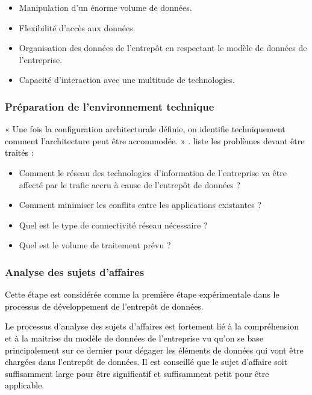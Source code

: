 \documentclass[a4paper,12pt]{report}
\begin{document}
\begin{itemize}

\item  Manipulation d’un énorme volume de données.
\item  Flexibilité d’accès aux données.
\item  Organisation des données de l’entrepôt en respectant le modèle de données de l’entreprise.
\item Capacité d’interaction avec une multitude de technologies.

\end{itemize}

\subsubsection{Préparation de l’environnement technique}

\textcolor{black}{« Une fois la configuration architecturale définie, on identifie techniquement comment l’architecture peut être accommodée. » \citep{inmon2002building}. \citep{inmon2002building} liste les problèmes devant être traités :}

\begin{itemize}
\item Comment le réseau des technologies d’information de l’entreprise va être affecté par le trafic accru à cause de l’entrepôt de données ?
\item Comment minimiser les conflits entre les applications existantes ?
\item Quel est le type de connectivité réseau nécessaire ?
\item Quel est le volume de traitement prévu ?

\end{itemize}

\subsubsection{Analyse des sujets d’affaires}

\textcolor{black}{Cette étape est considérée comme la première étape expérimentale dans le processus de développement de l’entrepôt de données.}

\textcolor{black}{
Le processus d’analyse des sujets d’affaires est fortement lié à la compréhension et à la maitrise du modèle de données de l’entreprise vu qu’on se base principalement sur ce dernier pour dégager les éléments de données qui vont être chargées dans l’entrepôt de données. Il est conseillé que le sujet d’affaire soit suffisamment large pour être significatif et suffisamment petit pour être applicable.}
\end{document}
